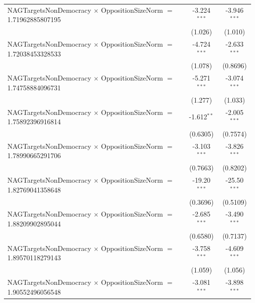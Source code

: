 \begin{tabular}{lcc}
   NAGTargetsNonDemocracy $\times$ OppositionSizeNorm $=$ 1.71962885807195      & -3.224$^{***}$       & -3.946$^{***}$\\   
                                                                                & (1.026)              & (1.010)\\   
   NAGTargetsNonDemocracy $\times$ OppositionSizeNorm $=$ 1.72038453328533      & -4.724$^{***}$       & -2.633$^{***}$\\   
                                                                                & (1.078)              & (0.8696)\\   
   NAGTargetsNonDemocracy $\times$ OppositionSizeNorm $=$ 1.74758884096731      & -5.271$^{***}$       & -3.074$^{***}$\\   
                                                                                & (1.277)              & (1.033)\\   
   NAGTargetsNonDemocracy $\times$ OppositionSizeNorm $=$ 1.75892396916814      & -1.612$^{**}$        & -2.005$^{***}$\\   
                                                                                & (0.6305)             & (0.7574)\\   
   NAGTargetsNonDemocracy $\times$ OppositionSizeNorm $=$ 1.78990665291706      & -3.103$^{***}$       & -3.826$^{***}$\\   
                                                                                & (0.7663)             & (0.8202)\\   
   NAGTargetsNonDemocracy $\times$ OppositionSizeNorm $=$ 1.82769041358648      & -19.20$^{***}$       & -25.50$^{***}$\\   
                                                                                & (0.3696)             & (0.5109)\\   
   NAGTargetsNonDemocracy $\times$ OppositionSizeNorm $=$ 1.88209902895044      & -2.685$^{***}$       & -3.490$^{***}$\\   
                                                                                & (0.6580)             & (0.7137)\\   
   NAGTargetsNonDemocracy $\times$ OppositionSizeNorm $=$ 1.89570118279143      & -3.758$^{***}$       & -4.609$^{***}$\\   
                                                                                & (1.059)              & (1.056)\\   
   NAGTargetsNonDemocracy $\times$ OppositionSizeNorm $=$ 1.90552496056548      & -3.081$^{***}$       & -3.898$^{***}$\\   

\end{tabular}
